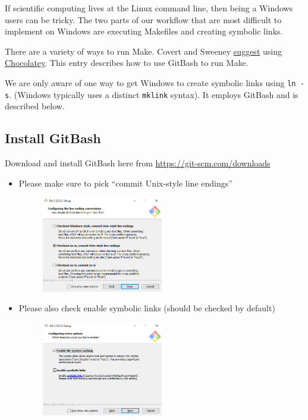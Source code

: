 If scientific computing lives at the Linux command line,
then being a Windows users can be tricky.
The two parts of our workflow that are most difficult to implement on Windows
are executing Makefiles and creating symbolic links.

There are a variety of ways to run Make.
Covert and Sweeney 
\href{https://github.com/rlsweeney/public_cs_texas/blob/master/README.md}{suggest}
using
\href{https://chocolatey.org/install}{Chocolatey}.
This entry describes how to use GitBash to run Make.

We are only aware of one way to get Windows
to create symbolic links using \texttt{ln -s}.
(Windows typically uses a distinct \texttt{mklink} syntax).
It employs GitBash and is described below.

\subsection{Install GitBash}
Download and install GitBash here from
\url{https://git-scm.com/downloads}
\begin{itemize}
    \item Please make sure to pick ``commit Unix-style line endings''
    \begin{figure}[H]
        \centering
        \includegraphics[width=0.5\textwidth]{figures/workflow/make_on_win_gitbash_screenshot1.png}
    \end{figure}
    \item Please also check enable symbolic links (should be checked by default)
    \begin{figure}[H]
        \centering
        \includegraphics[width=0.5\textwidth]{figures/workflow/make_on_win_gitbash_screenshot2.png}
    \end{figure}
\end{itemize}


